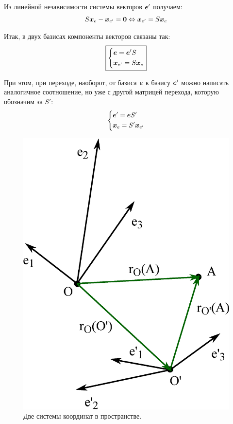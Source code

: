 \documentclass[a4paper,12pt]{article}
\begin{document}
  Из линейной независимости системы векторов $\boldsymbol e'$ получаем:
  \[
    S \boldsymbol x_e - \boldsymbol x_{e'} = \boldsymbol 0 \Leftrightarrow \boldsymbol x_{e'} = S \boldsymbol x_e
  \]
  
  Итак, в двух базисах компоненты векторов связаны так:
  \begin{equation}\label{eq:vector1-to-vector2}
    \boxed{
      \left\{
        \begin{aligned}
          &\boldsymbol e = \boldsymbol e' S\\
          &\boldsymbol x_{e'} = S \boldsymbol x_e
        \end{aligned}
      \right.
    }
  \end{equation}
  
  При этом, при переходе, наоборот, от базиса $\boldsymbol e$ к базису $\boldsymbol e'$
  можно написать аналогичное соотношение, но уже с другой матрицей перехода, которую обозначим за $S'$:
  \[
    \left\{
      \begin{aligned}
        &\boldsymbol e' = \boldsymbol e S'\\
        &\boldsymbol x_{e} = S' \boldsymbol x_{e'}
      \end{aligned}
    \right.
  \]

  \begin{figure}[h]
    \centering
    
    \includegraphics[width=0.5\columnwidth]{two-coords}
    
    \caption{Две системы координат в пространстве.}
    \label{fig:two-coords}
  \end{figure}
\end{document}
